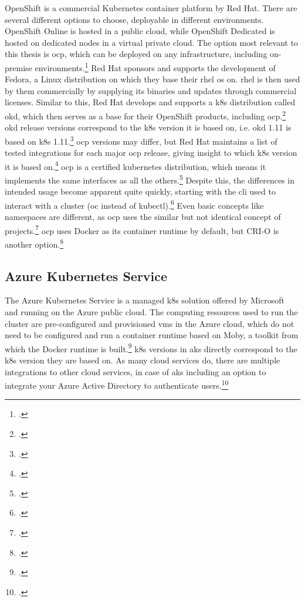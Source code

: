 OpenShift is a commercial Kubernetes container platform by Red Hat. There are several different options to choose, deployable in different environments. OpenShift Online is hosted in a public cloud, while OpenShift Dedicated is hosted on dedicated nodes in a virtual private cloud. The option most relevant to this thesis is \gls{ocp}, which can be deployed on any infrastructure, including on-premise environments.\footcite{openShiftOptions}
Red Hat sponsors and supports the development of Fedora, a Linux distribution on which they base their \gls{rhel} \gls{os} on. \gls{rhel} is then used by them commercially by supplying its binaries and updates through commercial licenses.
Similar to this, Red Hat develops and supports a \gls{k8s} distribution called \gls{okd}, which then serves as a base for their OpenShift products, including \gls{ocp}.\footcite{ocpVsOkd}
\gls{okd} release versions correspond to the \gls{k8s} version it is based on, i.e. \gls{okd} 1.11 is based on \gls{k8s} 1.11.\footcite{okd}
\gls{ocp} versions may differ, but Red Hat maintains a list of tested integrations for each major \gls{ocp} release, giving insight to which \gls{k8s} version it is based on.\footcite{ocpK8sVersions}
\gls{ocp} is a certified kubernetes distribution, which means it implements the same interfaces as all the others.\footcite{certifiedK8s}
Despite this, the differences in intended usage become apparent quite quickly, starting with the \gls{cli} used to interact with a cluster (oc instead of kubectl).\footcite{ocpCli}
Even basic concepts like namespaces are different, as \gls{ocp} uses the similar but not identical concept of projects.\footcite{ocpProjects}
\gls{ocp} uses Docker as its container runtime by default, but CRI-O is another option.\footcite{ocpCrio}

\subsection{Azure Kubernetes Service}

The Azure Kubernetes Service is a managed \gls{k8s} solution offered by Microsoft and running on the Azure public cloud. 
The computing resources used to run the cluster are pre-configured and provisioned \gls{vm}s in the Azure cloud, which do not need to be configured and run a container runtime based on Moby, a toolkit from which the Docker runtime is built.\footcite{dockerMoby} 
\gls{k8s} versions in \gls{aks} directly correspond to the \gls{k8s} version they are based on.
As many cloud services do, there are multiple integrations to other cloud services, in case of \gls{aks} including an option to integrate your Azure Active Directory to authenticate users.\footcite{aadAksAuth}


